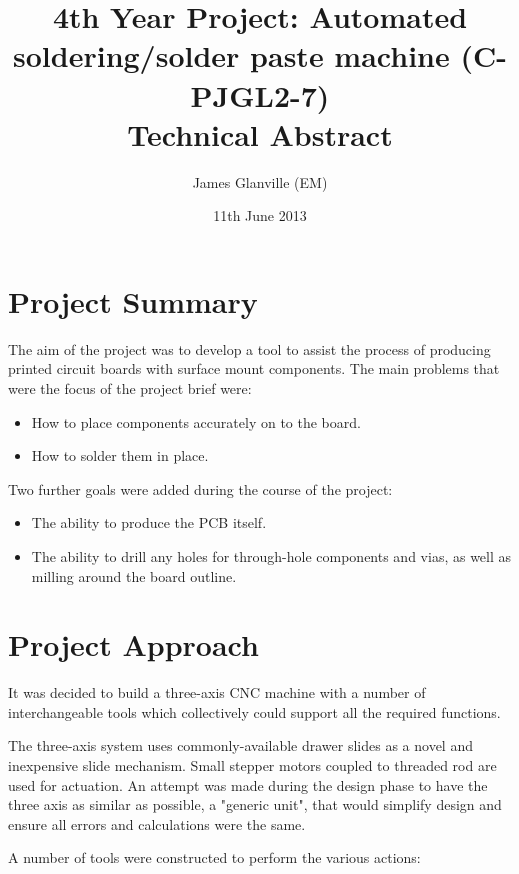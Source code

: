 \documentclass[a4paper,11pt]{article}  %
\title{4th Year Project: Automated soldering/solder paste machine (C-PJGL2-7) \\ Technical Abstract} %
\author{James Glanville (EM)}
\date{11th June 2013}
\begin{document}
\maketitle



\section*{Project Summary}
The aim of the project was to develop a tool to assist the process of 
producing printed circuit boards with surface mount components. The main problems that
were the focus of the project brief were:

\begin{itemize}\itemsep0em
\item
How to place components accurately on to the board.
\item
How to solder them in place.
\end{itemize}

Two further goals were added during the course of the project:

\begin{itemize}\itemsep0em
\item
The ability to produce the PCB itself.
\item
The ability to drill any holes for through-hole components and vias, as
well as milling around the board outline.
\end{itemize}

\section*{Project Approach}
It was decided to build a three-axis CNC machine with a number of interchangeable
tools which collectively could support all the required functions.

The three-axis system uses commonly-available drawer slides as a novel
and inexpensive slide mechanism. Small stepper motors coupled to threaded
rod are used for actuation. An attempt was made during the design phase
to have the three axis as similar as possible, a "generic unit", that would
simplify design and ensure all errors and calculations were the same.

A number of tools were constructed to perform the various actions:
\end{document}
